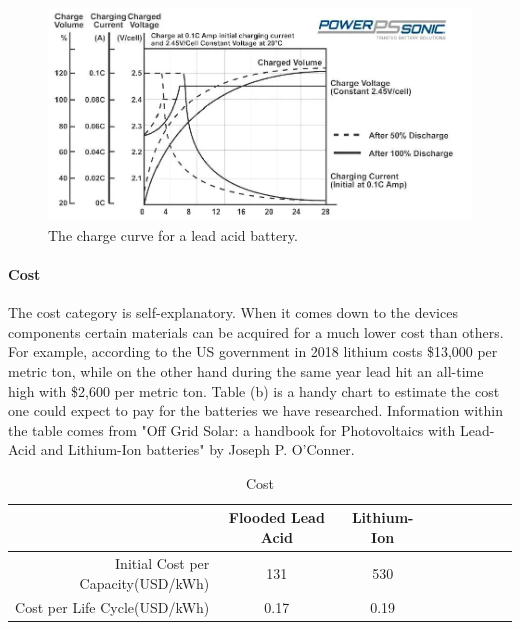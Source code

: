 \begin{figure}
    \centering
    \includegraphics[scale=0.5]{figures/lead acid charge curve.png}
    \caption{The charge curve for a lead acid battery.}
    \label{fig:lead-acid-charge-curve} 
\end{figure}
\paragraph{Cost}
The cost category is self-explanatory. When it comes down to the devices components certain materials can be acquired for a much lower cost than others. For example, according to the US government in 2018 lithium costs \$13,000 per metric ton, while on the other hand during the same year lead hit an all-time high with \$2,600 per metric ton. Table (b) is a handy chart to estimate the cost one could expect to pay for the batteries we have researched. Information within the table comes from "Off Grid Solar: a handbook for Photovoltaics with Lead-Acid and Lithium-Ion batteries" by Joseph P. O'Conner.

\begin{table}[H]
\centering\scriptsize
\caption{Cost}
\begin{tabular}{|r|c|c|c|c|c|c|c|c|}
\hline
  & Flooded Lead Acid & Lithium-Ion \\ 
\hline\hline

Initial Cost per Capacity(USD/kWh)    & 131   & 530  \\\hline
Cost per Life Cycle(USD/kWh)    & 0.17     & 0.19 \\\hline

\end{tabular}
\end{table}

